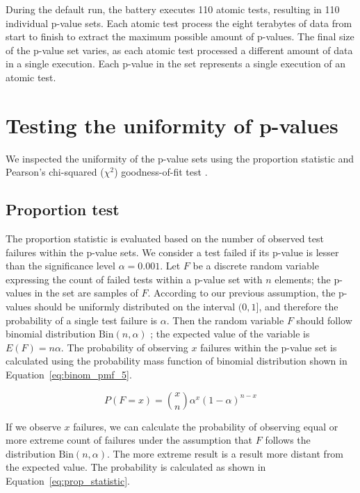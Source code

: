 \documentclass[
  digital,  	%
  color,		%
  oneside,   	%
  12pt,
  nocover,
  notable,
  nolof,
  nolot,
]{fithesis3}
\theoremstyle{definition}
\theoremstyle{remark}
\begin{document}
During the default run, the battery executes 110 atomic tests, resulting in 110 individual p-value sets. Each atomic test process the eight terabytes of data from start to finish to extract the maximum possible amount of p-values. The final size of the p-value set varies, as each atomic test processed a different amount of data in a single execution. Each p-value in the set represents a single execution of an atomic test.

\section{Testing the uniformity of p-values}
\label{sec:testing_uniformity_dh}
We inspected the uniformity of the p-value sets using the proportion statistic and Pearson's chi-squared ($\chi^2$) goodness-of-fit test \cite[p.~219]{stat-handbook}.

\subsection{Proportion test}
The proportion statistic is evaluated based on the number of observed test failures within the p-value sets. We consider a test failed if its p-value is lesser than the significance level $\alpha=0.001$. Let $F$ be a discrete random variable expressing the count of failed tests within a p-value set with $n$ elements; the p-values in the set are samples of $F$. According to our previous assumption, the p-values should be uniformly distributed on the interval $(0,1]$, and therefore the probability of a single test failure is $\alpha$. Then the random variable $F$ should follow binomial distribution $\text{Bin}(n,\alpha)$ \cite[p.~245]{stat-handbook}; the expected value of the variable is $E(F) = n\alpha$. The probability of observing $x$ failures within the p-value set is calculated using the probability mass function of binomial distribution shown in Equation~\ref{eq:binom_pmf_5}.

\begin{equation}
\label{eq:binom_pmf_5}
P(F = x) = \binom xn \alpha^x(1-\alpha)^{n-x}
\end{equation}

If we observe $x$ failures, we can calculate the probability of observing equal or more extreme count of failures under the assumption that $F$ follows the distribution $\text{Bin}(n,\alpha)$. The more extreme result is a result more distant from the expected value. The probability is calculated as shown in Equation~\ref{eq:prop_statistic}.
\end{document}
